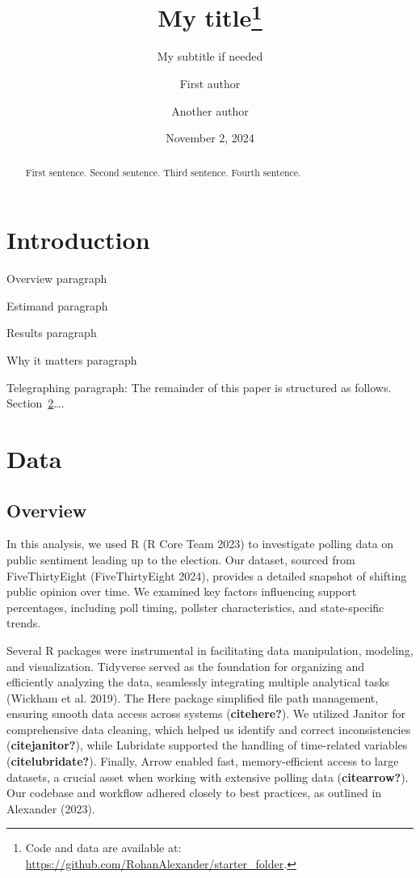 \documentclass[
  letterpaper,
  DIV=11,
  numbers=noendperiod]{scrartcl}
\title{My title\thanks{Code and data are available at:
\url{https://github.com/RohanAlexander/starter_folder}.}}
\subtitle{My subtitle if needed}
\author{First author \and Another author}
\date{November 2, 2024}
\begin{document}
\maketitle
\begin{abstract}
First sentence. Second sentence. Third sentence. Fourth sentence.
\end{abstract}


\section{Introduction}\label{introduction}

Overview paragraph

Estimand paragraph

Results paragraph

Why it matters paragraph

Telegraphing paragraph: The remainder of this paper is structured as
follows. Section~\ref{sec-data}\ldots.

\section{Data}\label{sec-data}

\subsection{Overview}\label{overview}

In this analysis, we used R (R Core Team 2023) to investigate polling
data on public sentiment leading up to the election. Our dataset,
sourced from FiveThirtyEight (FiveThirtyEight 2024), provides a detailed
snapshot of shifting public opinion over time. We examined key factors
influencing support percentages, including poll timing, pollster
characteristics, and state-specific trends.

Several R packages were instrumental in facilitating data manipulation,
modeling, and visualization. Tidyverse served as the foundation for
organizing and efficiently analyzing the data, seamlessly integrating
multiple analytical tasks (Wickham et al. 2019). The Here package
simplified file path management, ensuring smooth data access across
systems (\textbf{citehere?}). We utilized Janitor for comprehensive data
cleaning, which helped us identify and correct inconsistencies
(\textbf{citejanitor?}), while Lubridate supported the handling of
time-related variables (\textbf{citelubridate?}). Finally, Arrow enabled
fast, memory-efficient access to large datasets, a crucial asset when
working with extensive polling data (\textbf{citearrow?}). Our codebase
and workflow adhered closely to best practices, as outlined in Alexander
(2023).
\end{document}
